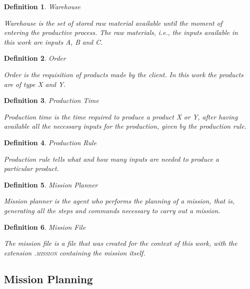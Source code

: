 \documentclass[conference,harvard,brazil,english]{sbatex}
\newtheorem{myDefinition}{Definition}
\begin{document}
\begin{myDefinition}{Warehouse}

Warehouse is the set of stored raw material available until the moment of entering the productive process. The raw materials, \textit{i.e.}, the inputs available in this work are inputs A, B and C.
\label{almoxarifado}
\end{myDefinition}

\begin{myDefinition}{Order}

Order is the requisition of products made by the client. In this work the products are of type X and Y.
\label{pedido}
\end{myDefinition}

\begin{myDefinition}{Production Time}

Production time is the time required to produce a product X or Y, after having available all the necessary inputs for the production, given by the production rule.
\label{tempoProducao}
\end{myDefinition}

\begin{myDefinition}{Production Rule}

Production rule tells what and how many inputs are needed to produce a particular product.
\label{regraProducao}
\end{myDefinition}

\begin{myDefinition}{Mission Planner}

Mission planner is the agent who performs the planning of a mission, that is, generating all the steps and commands necessary to carry out a mission.
\label{planejadorMissao}
\end{myDefinition}

\begin{myDefinition}{Mission File}

The mission file is a file that was created for the context of this work, with the extension \textsc{.mission} containing the mission itself.
\label{arquivoMissao}
\end{myDefinition}


\subsection{Mission Planning}
\label{subsec:missionplanning}
\end{document}
